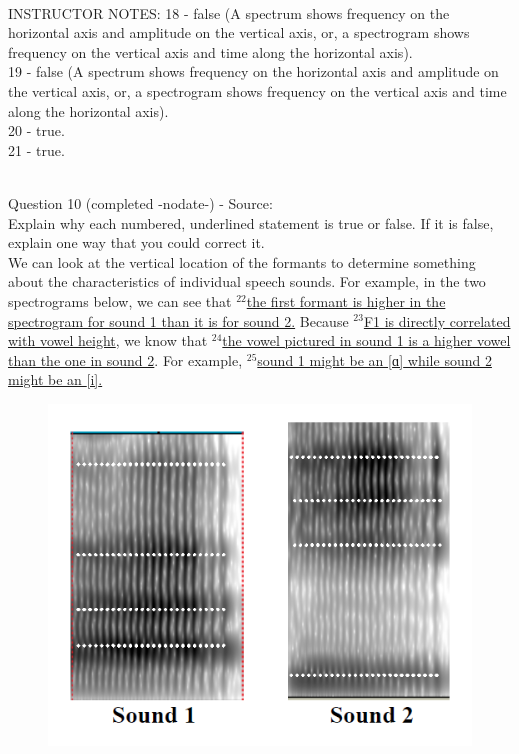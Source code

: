 \documentclass[12pt]{article}
\begin{document}
~\\
INSTRUCTOR NOTES: 18 - false (A spectrum shows frequency on the horizontal axis and amplitude on the vertical axis, or, a spectrogram shows frequency on the vertical axis and time along the horizontal axis).\\19 - false (A spectrum shows frequency on the horizontal axis and amplitude on the vertical axis, or, a spectrogram shows frequency on the vertical axis and time along the horizontal axis).\\20 - true.\\21 - true.


~\\

{\large Question 10} (completed -nodate-) - Source: \\

Explain why each numbered, underlined statement is true or false. If it is false, explain one way that you could correct it.\\

We can look at the vertical location of the formants to determine something about the characteristics of individual speech sounds. For example, in the two spectrograms below, we can see that $^{22}$\ul{the first formant is higher in the spectrogram for sound 1 than it is for sound 2.} Because $^{23}$\ul{F1 is directly correlated with vowel height}, we know that $^{24}$\ul{the vowel pictured in sound 1 is a higher vowel than the one in sound 2}. For example, $^{25}$\ul{sound 1 might be an {[ɑ]} while sound 2 might be an {[i]}.}

\begin{figure}[H]
\includegraphics{../images/sound1a_sound2i.png}
\end{figure}
\end{document}
